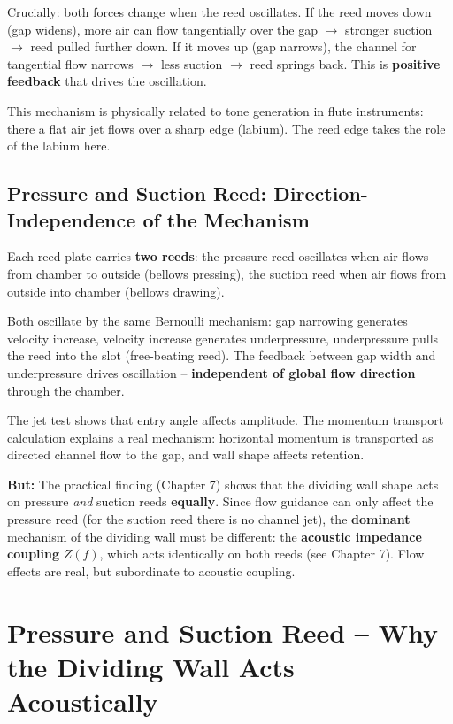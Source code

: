 \documentclass[11pt,a4paper]{article}
\begin{document}
Crucially: both forces change when the reed oscillates. If the reed moves down (gap widens), more air can flow tangentially over the gap $\rightarrow$ stronger suction $\rightarrow$ reed pulled further down. If it moves up (gap narrows), the channel for tangential flow narrows $\rightarrow$ less suction $\rightarrow$ reed springs back. This is \textbf{positive feedback} that drives the oscillation.

This mechanism is physically related to tone generation in flute instruments: there a flat air jet flows over a sharp edge (labium). The reed edge takes the role of the labium here.

\subsection{Pressure and Suction Reed: Direction-Independence of the Mechanism}

Each reed plate carries \textbf{two reeds}: the pressure reed oscillates when air flows from chamber to outside (bellows pressing), the suction reed when air flows from outside into chamber (bellows drawing).

Both oscillate by the same Bernoulli mechanism: gap narrowing generates velocity increase, velocity increase generates underpressure, underpressure pulls the reed into the slot (free-beating reed). The feedback between gap width and underpressure drives oscillation -- \textbf{independent of global flow direction} through the chamber.

\begin{keybox}
The jet test shows that entry angle affects amplitude. The momentum transport calculation explains a real mechanism: horizontal momentum is transported as directed channel flow to the gap, and wall shape affects retention.

\textbf{But:} The practical finding (Chapter 7) shows that the dividing wall shape acts on pressure \textit{and} suction reeds \textbf{equally}. Since flow guidance can only affect the pressure reed (for the suction reed there is no channel jet), the \textbf{dominant} mechanism of the dividing wall must be different: the \textbf{acoustic impedance coupling} $Z(f)$, which acts identically on both reeds (see Chapter 7). Flow effects are real, but subordinate to acoustic coupling.
\end{keybox}

\section{Pressure and Suction Reed -- Why the Dividing Wall Acts Acoustically}
\end{document}
